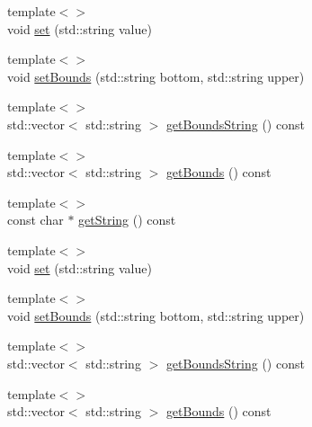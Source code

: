 \begin{DoxyCompactItemize}
\item 
{\footnotesize template$<$$>$ }\\void \hyperlink{classmaudio_1_1SimpleProperty_ae8b2e6a1633cf60fb5868e5774b5596a}{set} (std\-::string value)
\item 
{\footnotesize template$<$$>$ }\\void \hyperlink{classmaudio_1_1SimpleProperty_a200fb7cf7cb0380c57b029332f2aff80}{set\-Bounds} (std\-::string bottom, std\-::string upper)
\item 
{\footnotesize template$<$$>$ }\\std\-::vector$<$ std\-::string $>$ \hyperlink{classmaudio_1_1SimpleProperty_a206ab48478c04d3c3711e95c9f5bc00f}{get\-Bounds\-String} () const
\item 
{\footnotesize template$<$$>$ }\\std\-::vector$<$ std\-::string $>$ \hyperlink{classmaudio_1_1SimpleProperty_a2f2e81c25e0f248effb86b1b2f9bc7df}{get\-Bounds} () const
\item 
{\footnotesize template$<$$>$ }\\const char $\ast$ \hyperlink{classmaudio_1_1SimpleProperty_a3033164121186a18c5e4bef19bf939de}{get\-String} () const
\item 
{\footnotesize template$<$$>$ }\\void \hyperlink{classmaudio_1_1SimpleProperty_ae8b2e6a1633cf60fb5868e5774b5596a}{set} (std\-::string value)
\item 
{\footnotesize template$<$$>$ }\\void \hyperlink{classmaudio_1_1SimpleProperty_a200fb7cf7cb0380c57b029332f2aff80}{set\-Bounds} (std\-::string bottom, std\-::string upper)
\item 
{\footnotesize template$<$$>$ }\\std\-::vector$<$ std\-::string $>$ \hyperlink{classmaudio_1_1SimpleProperty_a206ab48478c04d3c3711e95c9f5bc00f}{get\-Bounds\-String} () const
\item 
{\footnotesize template$<$$>$ }\\std\-::vector$<$ std\-::string $>$ \hyperlink{classmaudio_1_1SimpleProperty_a2f2e81c25e0f248effb86b1b2f9bc7df}{get\-Bounds} () const
\end{DoxyCompactItemize}


